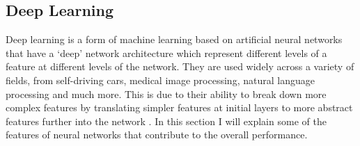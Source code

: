 \documentclass[12pt, onecolumn]{aa}
\begin{document}
\begin{table}[t]

\centering
{}

\caption{The conversion between the Hubble class and the T-Type value \label{table:ttypes}}
\end{table}

\subsection{Deep Learning}\label{sec:deepbackground} 
Deep learning is a form of machine learning based on artificial neural networks that have a ‘deep’ network architecture which represent different levels of a feature at different levels of the network. They are used widely across a variety of fields, from self-driving cars, medical image processing, natural language processing and much more. This is due to their ability to break down more complex features by translating simpler features at initial layers to more abstract features further into the network \citep{Lecun2015}. 
In this section I will explain some of the features of neural networks that contribute to the overall performance. 
\end{document}
